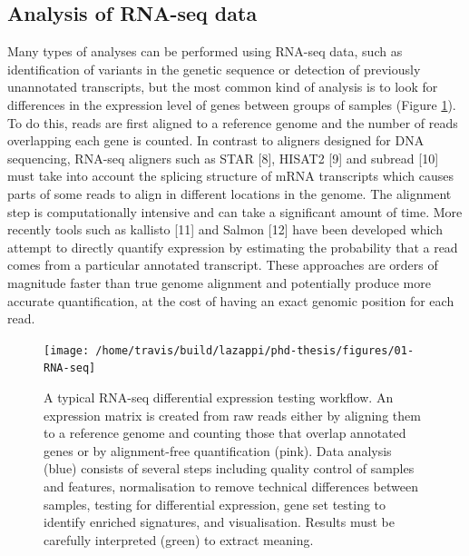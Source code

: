 \documentclass[11pt,a4paper,titlepage,twoside,openright]{style/unimelbthesis}
\theoremstyle{definition}
\theoremstyle{definition}
\theoremstyle{definition}
\theoremstyle{remark}
\begin{document}
\begin{mainmatter}
\hypertarget{analysis-of-rna-seq-data}{%
\subsection{Analysis of RNA-seq data}\label{analysis-of-rna-seq-data}}

Many types of analyses can be performed using RNA-seq data, such as identification of variants in the genetic sequence or detection of previously unannotated transcripts, but the most common kind of analysis is to look for differences in the expression level of genes between groups of samples (Figure \ref{fig:RNA-seq}). To do this, reads are first aligned to a reference genome and the number of reads overlapping each gene is counted. In contrast to aligners designed for DNA sequencing, RNA-seq aligners such as STAR {[}8{]}, HISAT2 {[}9{]} and subread {[}10{]} must take into account the splicing structure of mRNA transcripts which causes parts of some reads to align in different locations in the genome. The alignment step is computationally intensive and can take a significant amount of time. More recently tools such as kallisto {[}11{]} and Salmon {[}12{]} have been developed which attempt to directly quantify expression by estimating the probability that a read comes from a particular annotated transcript. These approaches are orders of magnitude faster than true genome alignment and potentially produce more accurate quantification, at the cost of having an exact genomic position for each read.

\begin{figure}

{\centering \texttt{[image: /home/travis/build/lazappi/phd-thesis/figures/01-RNA-seq]} 

}

\caption[A typical RNA-seq differential expression testing workflow.]{A typical RNA-seq differential expression testing workflow. An expression matrix is created from raw reads either by aligning them to a reference genome and counting those that overlap annotated genes or by alignment-free quantification (pink). Data analysis (blue) consists of several steps including quality control of samples and features, normalisation to remove technical differences between samples, testing for differential expression, gene set testing to identify enriched signatures, and visualisation. Results must be carefully interpreted (green) to extract meaning.}\label{fig:RNA-seq}
\end{figure}






\end{mainmatter}
\end{document}
